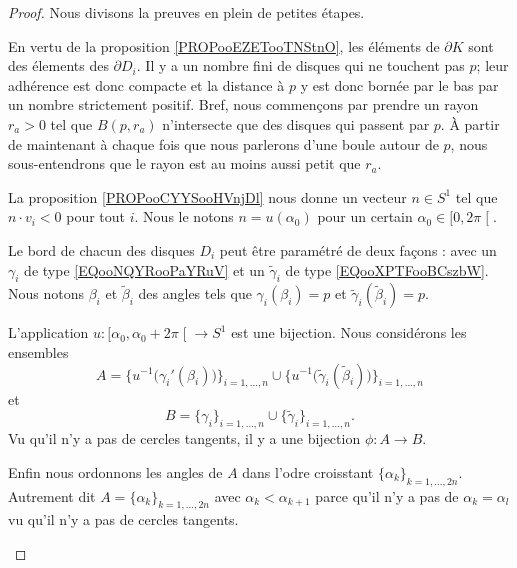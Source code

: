 \begin{proof}
	Nous divisons la preuves en plein de petites étapes.

	\begin{subproof}
		\spitem[Le bord]
		En vertu de la proposition \ref{PROPooEZETooTNStnO}, les éléments de \( \partial K\) sont des élements des \( \partial D_i\).
		Il y a un nombre fini de disques qui ne touchent pas \( p\); leur adhérence est donc compacte et la distance à \( p\) y est donc bornée par le bas par un nombre strictement positif. Bref, nous commençons par prendre un rayon \( r_a>0\) tel que \( B(p,r_a)\) n'intersecte que des disques qui passent par \( p\). À partir de maintenant à chaque fois que nous parlerons d'une boule autour de \( p\), nous sous-entendrons que le rayon est au moins aussi petit que \( r_a\).

		La proposition \ref{PROPooCYYSooHVnjDl} nous donne un vecteur \( n\in S^1\) tel que \( n\cdot v_i<0\) pour tout \( i\). Nous le notons \( n=u(\alpha_0)\) pour un certain \( \alpha_0\in\mathopen[ 0,2\pi\mathclose[\).

		Le bord de chacun des disques \( D_i\) peut être paramétré de deux façons : avec un \( \gamma_i\) de type \eqref{EQooNQYRooPaYRuV} et un \( \tilde \gamma_i\) de type \eqref{EQooXPTFooBCszbW}. Nous notons \( \beta_i\) et \( \tilde \beta_i\) des angles tels que \( \gamma_i(\beta_i)=p\) et \( \tilde \gamma_i(\tilde \beta_i)=p\).

		L'application \(u \colon \mathopen[ \alpha_0,\alpha_0+2\pi\mathclose[\to S^1  \) est une bijection. Nous considérons les ensembles
		\begin{equation}
			A=\{ u^{-1}\big( \gamma_i'(\beta_i) \big) \}_{i=1,\ldots,n}\cup\{ u^{-1}\big( \tilde \gamma_i(\tilde \beta_i) \big) \}_{i=1,\ldots,n}
		\end{equation}
		et
		\begin{equation}
			B=\{ \gamma_i \}_{i=1,\ldots,n}\cup\{ \tilde \gamma_i \}_{i=1,\ldots,n}.
		\end{equation}
		Vu qu'il n'y a pas de cercles tangents, il y a une bijection \(\phi \colon A\to B  \).

		Enfin nous ordonnons les angles de \( A\) dans l'odre croisstant \( \{ \alpha_k \}_{k=1,\ldots,2n}\). Autrement dit \( A=\{ \alpha_k \}_{k=1,\ldots,2n}\) avec \( \alpha_k<\alpha_{k+1}\) parce qu'il n'y a pas de \( \alpha_k=\alpha_l\) vu qu'il n'y a pas de cercles tangents.


\end{subproof}
\end{proof}
